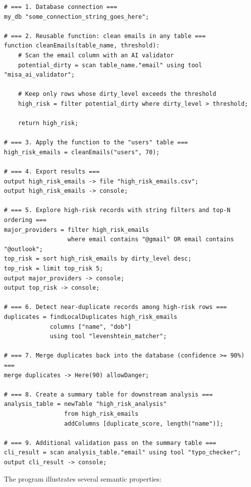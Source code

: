\begin{itemize}[label=-, noitemsep]
\begin{itemize}[label=-, noitemsep]
\begin{itemize}[label=-, noitemsep]
\begin{itemize}[label=-, noitemsep]
\begin{lstlisting}[style=dsl, caption={Annotated DaQuVa example program.}, label={lst:example}]
# === 1. Database connection ===
my_db "some_connection_string_goes_here";

# === 2. Reusable function: clean emails in any table ===
function cleanEmails(table_name, threshold):
    # Scan the email column with an AI validator
    potential_dirty = scan table_name."email" using tool "misa_ai_validator";

    # Keep only rows whose dirty_level exceeds the threshold
    high_risk = filter potential_dirty where dirty_level > threshold;

    return high_risk;

# === 3. Apply the function to the "users" table ===
high_risk_emails = cleanEmails("users", 70);

# === 4. Export results ===
output high_risk_emails -> file "high_risk_emails.csv";
output high_risk_emails -> console;

# === 5. Explore high-risk records with string filters and top-N ordering ===
major_providers = filter high_risk_emails
                  where email contains "@gmail" OR email contains "@outlook";
top_risk = sort high_risk_emails by dirty_level desc;
top_risk = limit top_risk 5;
output major_providers -> console;
output top_risk -> console;

# === 6. Detect near-duplicate records among high-risk rows ===
duplicates = findLocalDuplicates high_risk_emails
             columns ["name", "dob"]
             using tool "levenshtein_matcher";

# === 7. Merge duplicates back into the database (confidence >= 90%) ===
merge duplicates -> Here(90) allowDanger;

# === 8. Create a summary table for downstream analysis ===
analysis_table = newTable "high_risk_analysis"
                 from high_risk_emails
                 addColumns [duplicate_score, length("name")];

# === 9. Additional validation pass on the summary table ===
cli_result = scan analysis_table."email" using tool "typo_checker";
output cli_result -> console;
\end{lstlisting}

The program illustrates several semantic properties:


\end{itemize}
\end{itemize}
\end{itemize}
\end{itemize}
